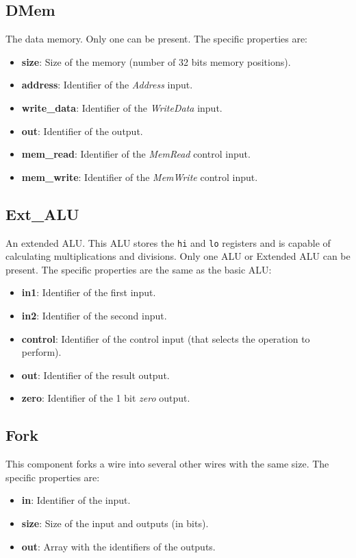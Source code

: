 \documentclass[11pt,a4paper,twoside,titlepage]{report}
\begin{document}
\subsection{DMem}

The data memory. Only one can be present. The specific properties are:
\begin{itemize}
	\item \textbf{size}: Size of the memory (number of 32 bits memory positions).
	\item \textbf{address}: Identifier of the \textit{Address} input.
	\item \textbf{write\_data}: Identifier of the \textit{WriteData} input.
	\item \textbf{out}: Identifier of the output.
	\item \textbf{mem\_read}: Identifier of the \textit{MemRead} control input.
	\item \textbf{mem\_write}: Identifier of the \textit{MemWrite} control input.
\end{itemize}

\subsection{Ext\_ALU}

An extended ALU. This ALU stores the \verb+hi+ and \verb+lo+ registers and is
capable of calculating multiplications and divisions.
Only one ALU or Extended ALU can be present. The specific properties are the same
as the basic ALU:
\begin{itemize}
	\item \textbf{in1}: Identifier of the first input.
	\item \textbf{in2}: Identifier of the second input.
	\item \textbf{control}: Identifier of the control input (that selects the operation
		to perform).
	\item \textbf{out}: Identifier of the result output.
	\item \textbf{zero}: Identifier of the 1 bit \emph{zero} output.
\end{itemize}

\subsection{Fork}

This component forks a wire into several other wires with the same size.
The specific properties are:
\begin{itemize}
	\item \textbf{in}: Identifier of the input.
	\item \textbf{size}: Size of the input and outputs (in bits).
	\item \textbf{out}: Array with the identifiers of the outputs.
\end{itemize}
\end{document}
